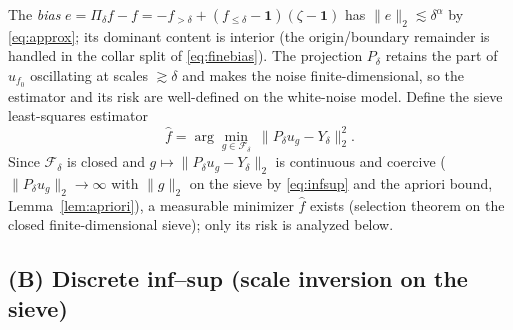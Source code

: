 \documentclass[11pt]{article}
\theoremstyle{remark}
\newcommand{\F}{\mathcal{F}}
\newcommand{\one}{\mathbf{1}}
\newcommand{\norm}[1]{\lVert #1\rVert}
\begin{document}
The \emph{bias} $e=\Pi_\delta f-f=-f_{>\delta}+(f_{\le\delta}-\one)
(\zeta-\one)$ has $\norm{e}_2\lesssim\delta^{\alpha}$ by
\eqref{eq:approx}; its dominant content is interior (the
origin/boundary remainder is handled in the collar split of
\eqref{eq:finebias}). The projection $P_\delta$ retains the part of
$u_{f_0}$ oscillating at scales $\gtrsim\delta$ and makes the noise
finite-dimensional, so the estimator and its risk are well-defined on
the white-noise model. Define the sieve
least-squares estimator
\[
\widehat f=\arg\min_{g\in\F_\delta}
\ \norm{P_\delta u_g-Y_\delta}_{2}^{2}.
\]
Since $\F_\delta$ is closed and
$g\mapsto\norm{P_\delta u_g-Y_\delta}_2$ is continuous and coercive
($\norm{P_\delta u_g}_2\to\infty$ with $\norm g_2$ on the sieve by
\eqref{eq:infsup} and the apriori bound, Lemma~\ref{lem:apriori}), a
measurable minimizer $\widehat f$ exists (selection theorem on the
closed finite-dimensional sieve); only its risk is analyzed below.

\subsection{(B) Discrete inf--sup (scale inversion on the sieve)}
\end{document}
